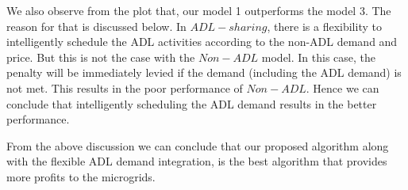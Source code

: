 We also observe from the plot that, our model 1 outperforms the model 3. The reason for that is discussed below.  In $ADL-sharing$, there is a flexibility to intelligently schedule the ADL activities according to the non-ADL demand and price. But this is not the case with the $Non-ADL$ model. In this case, the penalty will be immediately levied if the demand (including the ADL demand) is not met. This results in the poor performance of $Non-ADL$. Hence we can conclude that intelligently scheduling the ADL demand results in the better performance.
  


From the above discussion we can conclude that our proposed algorithm along with the flexible ADL demand integration, is the best algorithm that provides more profits to the microgrids. 